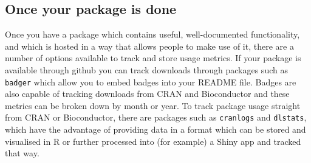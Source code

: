 \documentclass[a4paper,11pt]{article}
\begin{document}
\subsection{Once your package is done}
Once you have a package which contains useful, well-documented functionality, and which is hosted in a way that allows people to make use of it, there are a number of options available to track and store usage metrics. If your package is available through github you can track downloads through packages such as \texttt{badger} which allow you to embed badges into your README file. Badges are also capable of tracking downloads from CRAN and Bioconductor and these metrics can be broken down by month or year. To track package usage straight from CRAN or Bioconductor, there are packages such as \texttt{cranlogs} \cite{cranlogs} and \texttt{dlstats}, which have the advantage of providing data in a format which can be stored and visualised in R or further processed into (for example) a Shiny app and tracked that way.





\end{document}
